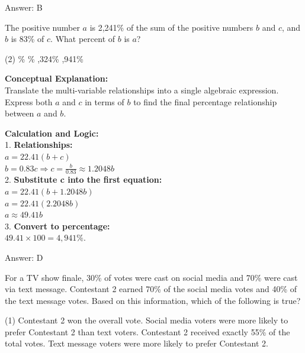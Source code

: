 \documentclass[11pt,paper=a4,answers]{exam}
\begin{document}
\begin{questions}
\begin{solution}
\vspace{30pt}

Answer: \colorbox{yellow!100}{B}
\end{solution}

\vspace{60pt}

\question
The positive number $a$ is 2,241\% of the sum of the positive numbers $b$ and $c$, and $b$ is 83\% of $c$. What percent of $b$ is $a$?
\begin{tasks}(2)
    \%
    \%
    ,324\%
    ,941\%
\end{tasks}

\begin{solution}
\textbf{Conceptual Explanation:} \\
Translate the multi-variable relationships into a single algebraic expression. Express both $a$ and $c$ in terms of $b$ to find the final percentage relationship between $a$ and $b$.

\vspace{30pt}

\textbf{Calculation and Logic:} \\
1. \textbf{Relationships:} \\
   $a = 22.41(b + c)$ \\
   $b = 0.83c \Rightarrow c = \frac{b}{0.83} \approx 1.2048b$ \\
2. \textbf{Substitute c into the first equation:} \\
   $a = 22.41(b + 1.2048b)$ \\
   $a = 22.41(2.2048b)$ \\
   $a \approx 49.41b$ \\
3. \textbf{Convert to percentage:} \\
   $49.41 \times 100 = 4,941\%$.

\vspace{30pt}

Answer: \colorbox{yellow!100}{D}
\end{solution}

\vspace{60pt}

\question
For a TV show finale, 30\% of votes were cast on social media and 70\% were cast via text message. Contestant 2 earned 70\% of the social media votes and 40\% of the text message votes. Based on this information, which of the following is true?
\begin{tasks}(1)
    \task Contestant 2 won the overall vote.
    \task Social media voters were more likely to prefer Contestant 2 than text voters.
    \task Contestant 2 received exactly 55\% of the total votes.
    \task Text message voters were more likely to prefer Contestant 2.
\end{tasks}


\end{questions}
\end{document}
